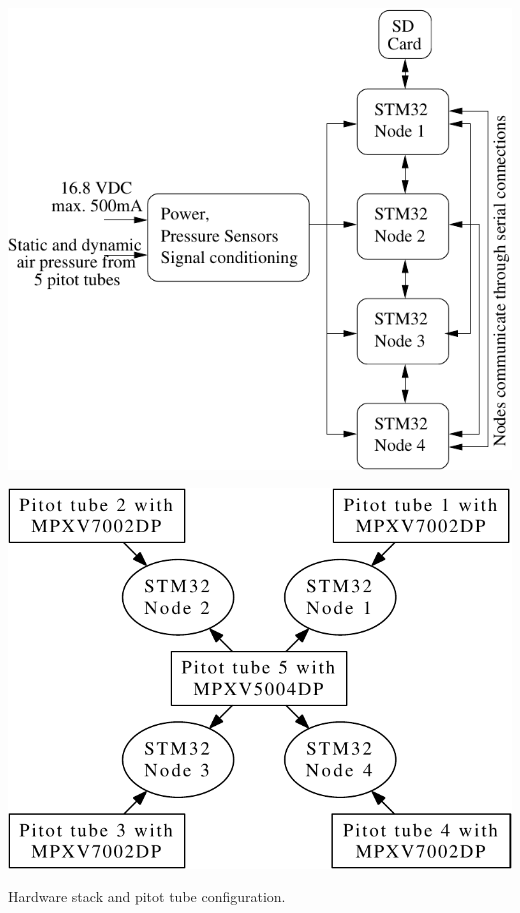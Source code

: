 \begin{myfig}
\begin{minipage}{0.5\linewidth}
\includegraphics[scale=0.5]{Figs/architecture}
\end{minipage}
\begin{minipage}{0.5\linewidth}
\includegraphics[scale=0.4]{Figs/architecture_sensors}
\end{minipage}
\caption{Hardware stack and pitot tube configuration.} \label{fig:case-study}\label{fig:stack-schema}
\end{myfig}

